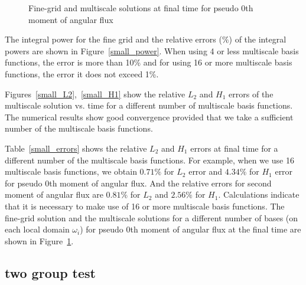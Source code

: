 \documentclass[preprint]{elsarticle}
\begin{document}
\begin{figure}[ht]
	\caption{Fine-grid and multiscale solutions at final time for pseudo 0th moment of angular flux}
	\label{small_solutions}
\end{figure}

The integral power for the fine grid and the relative errors ($\%$) of the integral powers are shown in Figure~\ref{small_power}.
When using 4 or less multiscale basis functions, the error is more than 10\% and for using 16 or more multiscale basis functions, the error it does not exceed 1\%.

Figures~\ref{small_L2},~\ref{small_H1} show the relative $L_2$ and $H_1$ errors of the multiscale solution vs. time for a different number of multiscale basis functions.
The numerical results show good convergence provided that we take a sufficient number of the multiscale basis functions.

Table~\ref{small_errors} shows the relative $L_2$ and $H_1$ errors at final time for a different number of the multiscale basis functions.
For example, when we use 16 multiscale basis functions, we obtain $0.71\%$ for $L_2$ error and $4.34\%$ for $H_1$ error for pseudo 0th moment of angular flux.
And the relative errors for second moment of angular flux are $0.81\%$ for $L_2$ and $2.56\%$ for $H_1$.
Calculations indicate that it is necessary to make use of 16 or more multiscale basis functions.
The fine-grid solution and the multiscale solutions for a different number of bases (on each local domain $\omega_i$) for pseudo 0th moment of angular flux at the final time are shown in Figure~\ref{small_solutions}.

\subsection{two group test}
%
\end{document}
